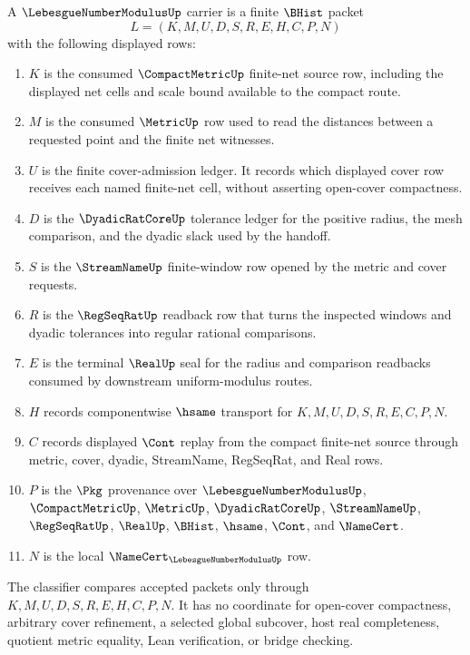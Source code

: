 \begin{definition}
\label{def:lebesgue-number-modulus-carrier}
A $\LebesgueNumberModulusUp$ carrier is a finite $\BHist$ packet
$$
L=(K,M,U,D,S,R,E,H,C,P,N)
$$
with the following displayed rows:
\begin{enumerate}
\item $K$ is the consumed $\CompactMetricUp$ finite-net source row, including the displayed net cells and scale bound available to the compact route.
\item $M$ is the consumed $\MetricUp$ row used to read the distances between a requested point and the finite net witnesses.
\item $U$ is the finite cover-admission ledger. It records which displayed cover row receives each named finite-net cell, without asserting open-cover compactness.
\item $D$ is the $\DyadicRatCoreUp$ tolerance ledger for the positive radius, the mesh comparison, and the dyadic slack used by the handoff.
\item $S$ is the $\StreamNameUp$ finite-window row opened by the metric and cover requests.
\item $R$ is the $\RegSeqRatUp$ readback row that turns the inspected windows and dyadic tolerances into regular rational comparisons.
\item $E$ is the terminal $\RealUp$ seal for the radius and comparison readbacks consumed by downstream uniform-modulus routes.
\item $H$ records componentwise $\hsame$ transport for $K,M,U,D,S,R,E,C,P,N$.
\item $C$ records displayed $\Cont$ replay from the compact finite-net source through metric, cover, dyadic, StreamName, RegSeqRat, and Real rows.
\item $P$ is the $\Pkg$ provenance over $\LebesgueNumberModulusUp$, $\CompactMetricUp$, $\MetricUp$, $\DyadicRatCoreUp$, $\StreamNameUp$, $\RegSeqRatUp$, $\RealUp$, $\BHist$, $\hsame$, $\Cont$, and $\NameCert$.
\item $N$ is the local $\NameCert_{\LebesgueNumberModulusUp}$ row.
\end{enumerate}
The classifier compares accepted packets only through $K,M,U,D,S,R,E,H,C,P,N$. It has no coordinate for open-cover compactness, arbitrary cover refinement, a selected global subcover, host real completeness, quotient metric equality, Lean verification, or bridge checking.
\end{definition}

